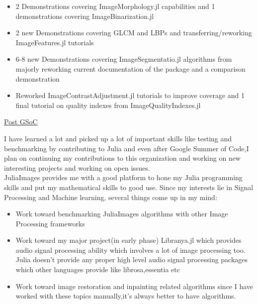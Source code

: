 \vspace{0.2cm}
\large
\begin{itemize}[topsep=0.2mm]
    \item 2 Demonstrations covering ImageMorphology.jl capabilities and 1 demonstrations covering ImageBinarization.jl
    \item 2 new Demonstrations covering GLCM and LBPs and transferring/reworking ImageFeatures.jl tutorials
    \item 6-8 new Demonstrations covering ImageSegmentatio.jl algorithms from majorly reworking current documentation of the package and a comparison demonstration
    \item Reworked ImageContrastAdjustment.jl tutorials to improve coverage and 1 final tutorial on quality indexes from ImageQualityIndexes.jl
\end{itemize}

\vspace{0.2cm}
\Large
\underline{\textsf{Post GSoC}}

\vspace{0.2cm}
\large
I have learned a lot and picked up a lot of important skills like testing and benchmarking by contributing to Julia and even after Google Summer of Code,I plan on continuing my contributions to this organization and working on new interesting projects and working on open issues.\\
JuliaImages provides me with a good platform to hone my Julia programming skills and put my mathematical skills to good use.
Since my interests lie in Signal Processing and Machine learning,
several things come up in my mind:
\begin{itemize}[noitemsep,topsep=0]
    \item Work toward benchmarking JuliaImages algorithms with other Image Processing frameworks
    \item Work toward my major project(in early phase) Libranya.jl which provides audio signal processing ability which involves a lot of image processing too. Julia doesn't provide any proper high level audio signal processing packages which other languages provide like librosa,essentia etc
    \item Work toward image restoration and inpainting related algorithms since I have worked with these topics manually,it's always better to have algorithms.
\end{itemize}